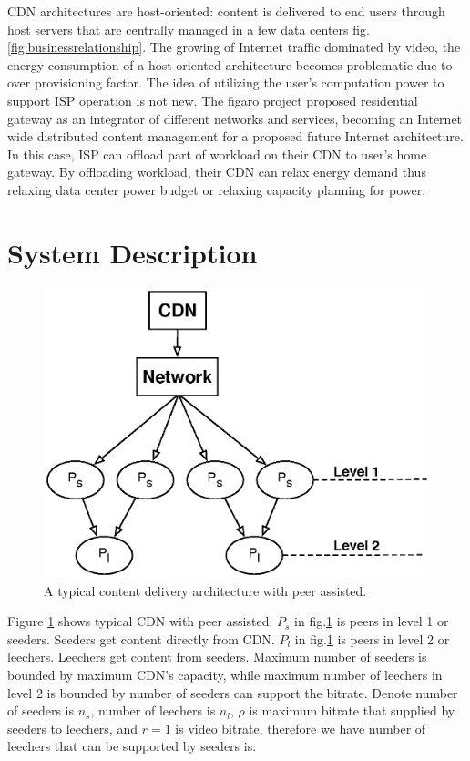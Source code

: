 \documentclass[JIP]{ipsj}
\begin{document}
CDN architectures are host-oriented: content is delivered to end users through host servers that are centrally managed in a few data centers fig.\ref{fig:businessrelationship}. 
The growing of Internet traffic dominated by video, the energy consumption of a host oriented architecture becomes problematic due to over provisioning factor.
The idea of utilizing the user's computation power to support ISP operation is not new. 
The figaro project proposed residential gateway as an integrator of different networks and services, becoming an Internet wide distributed content management for a proposed future Internet architecture.  
In this case, ISP can offload part of workload on their CDN to user's home gateway.  
By offloading workload, their CDN can relax energy demand thus relaxing data center power budget or relaxing capacity planning for power.





\section{System Description}\label{system model}
\begin{figure}[thb]
\begin{center}
\includegraphics[scale=0.6]{graphs/p2p-cdn.eps}
\end{center}
\caption{A typical content delivery architecture with peer assisted.}
\label{fig:iptv}
\vspace{-2mm}
\end{figure} 

Figure \ref{fig:iptv} shows typical CDN with peer assisted.  
$P_s$ in fig.\ref{fig:iptv} is peers in level 1 or seeders.  
Seeders get content directly from CDN.  
$P_l$ in fig.\ref{fig:iptv} is peers in level 2 or leechers.
Leechers get content from seeders.
Maximum number of seeders is bounded by maximum CDN's capacity, while maximum number of leechers in level 2 is bounded by number of seeders can support the bitrate.
Denote number of seeders is $n_s$, number of leechers is $n_l$, $\rho$ is maximum bitrate that supplied by seeders to leechers, and $r=1$ is video bitrate, therefore we have number of leechers that can be supported by seeders is:
\end{document}

